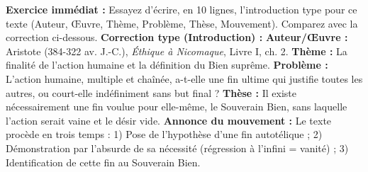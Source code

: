 \documentclass[11pt]{article}
\begin{document}
\begin{experience}
\textbf{Exercice immédiat :} Essayez d'écrire, en 10 lignes, l'introduction type pour ce texte (Auteur, Œuvre, Thème, Problème, Thèse, Mouvement). Comparez avec la correction ci-dessous.
\tcblower
\textbf{Correction type (Introduction) :}
\textbf{Auteur/Œuvre :} Aristote (384-322 av. J.-C.), \emph{Éthique à Nicomaque}, Livre I, ch. 2.
\textbf{Thème :} La finalité de l'action humaine et la définition du Bien suprême.
\textbf{Problème :} L'action humaine, multiple et chaînée, a-t-elle une fin ultime qui justifie toutes les autres, ou court-elle indéfiniment sans but final ?
\textbf{Thèse :} Il existe nécessairement une fin voulue pour elle-même, le Souverain Bien, sans laquelle l'action serait vaine et le désir vide.
\textbf{Annonce du mouvement :} Le texte procède en trois temps : 1) Pose de l'hypothèse d'une fin autotélique ; 2) Démonstration par l'absurde de sa nécessité (régression à l'infini = vanité) ; 3) Identification de cette fin au Souverain Bien.
\end{experience}
\end{document}

